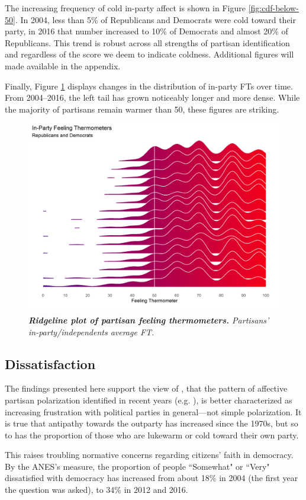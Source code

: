 \documentclass[12pt]{paper}
\begin{document}
The increasing frequency of cold in-party affect is shown in Figure \ref{fig:cdf-below-50}. In 2004, less than 5\% of Republicans and Democrats were cold toward their party, in 2016 that number increased to 10\% of Democrats and almost 20\% of Republicans. This trend is robust across all strengths of partisan identification and regardless of the score we deem to indicate coldness. Additional figures will made available in the appendix.



Finally, Figure \ref{fig:ridge} displays changes in the distribution of in-party FTs over time. From 2004--2016, the left tail has grown noticeably longer and more dense. While the majority of partisans remain warmer than 50, these figures are striking.

\begin{figure}
\centering
\includegraphics[width=.6\textwidth]{cdf-ridge-ns.png}
\caption{\label{fig:ridge} \textit{\textbf{Ridgeline plot of partisan feeling thermometers.} Partisans' in-party/independents average FT.}}
\end{figure}


\subsection{Dissatisfaction}

The findings presented here support the view of \cite{klar2018affective}, that the pattern of  affective partisan polarization identified in recent years (e.g. \citet{iyengar2012affect}), is better characterized as increasing frustration with political parties in general---not simple polarization. It is true that antipathy towards the outparty has increased since the 1970s, but so to has the proportion of those who are lukewarm or cold toward their own party.

This raises troubling normative concerns regarding citizens' faith in democracy. By the ANES's measure, the proportion of people ``Somewhat" or ``Very" dissatisfied with democracy has increased from about 18\% in 2004 (the first year the question was asked), to 34\% in 2012 and 2016.
\end{document}
